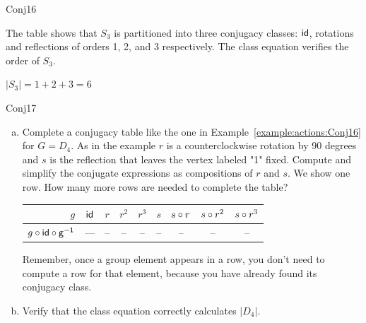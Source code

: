 \begin {example}{Conj16}

The table shows that $S_3$ is partitioned into  three conjugacy classes: $\sf{id}$, rotations and reflections of orders 1, 2, and 3 respectively.  The class equation verifies the order of $S_3$.

$|S_3|=1+2+3=6$
\end{example}

\begin {exercise}{Conj17}
\begin {enumerate}[(a)]
\item Complete a conjugacy table like the one in  Example~\ref{example:actions:Conj16} for $G=D_4$. As in the example $r$ is a counterclockwise rotation by 90 degrees and $s$ is the reflection that leaves the vertex labeled "1" fixed. Compute and simplify the conjugate expressions as compositions of $r$ and $s$. We show one row.  How many more rows are needed to complete the table?

\begin{center}

\begin{tabular}{ |r| c | c |c |c |c |c | c|c |} \hline
  $g$ &$\sf{id}$ & $r$ &$r^2$ &$r^3$ & $s$ &$s\circ r$ & $s\circ r ^2$ & $s\circ r^3$\\ \hline
  $g\circ \sf{id}\circ g^{-1}$ &--- & -- & -- &-- &--&--&--&-- \\
\end{tabular}
\end{center}

 Remember, once a group element appears in a row, you don't need to compute a row for that element, because you have already found its conjugacy class.
\item Verify that the class equation correctly calculates $|D_4|$.
\end{enumerate}
\end{exercise}

